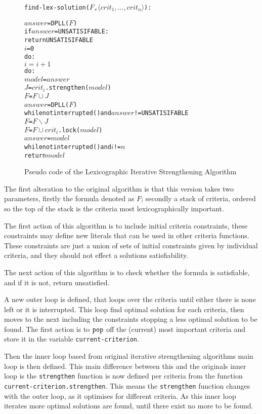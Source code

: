 \begin{figure}[htp]
\begin{center}
\begin{alltt}
find-lex-solution(\(F\), \(\langle crit_1, \ldots ,crit_n \rangle \)):
    
    \(answer\) = DPLL(\(F\))
    if \(answer\) = UNSATISIFABLE:
        return UNSATISIFABLE
    \(i\) = 0
    do:
        \(i = i + 1\)
        do:
            \(model\) = \(answer\)
            \(J\) = \(crit_i\).strengthen(\(model\))
            \(F\) = \(F \cup J\)
            \(answer\) = DPLL(\(F\))
        while not interrupted() and \(answer\) != UNSATISIFABLE
        \(F\) = \(F \backslash J\)
        \(F\) = \(F \cup \) \(crit_i\).lock(\(model\))
        \(answer\) = \(model\)
    while not interrupted() and \(i\) != \(n\)
    return \(model\) 
\end{alltt}
  \caption{Pseudo code of the Lexicographic Iterative Strengthening Algorithm}
  \label{impl.lexstrength}
\end{center}
\end{figure}

The first alteration to the original algorithm is that this version takes two parameters, firstly the formula denoted as $F$;
secondly a stack of criteria, ordered so the top of the stack is the criteria most lexicographically important.

The first action of this algorithm is to include initial criteria constraints,
these constraints may define new literals that can be used in other criteria functions.
These constraints are just a union of sets of initial constraints given by individual criteria, and they should not effect a solutions satisfiability. 

The next action of this algorithm is to check whether the formula is satisfiable,
and if it is not, return unsatisfied.

A new outer loop is defined, that loops over the criteria until either there is none left or it is interrupted.
This loop find optimal solution for each criteria, then moves to the next including the constraints stopping a less optimal solution to be found.
The first action is to $\verb+pop+$ off the (current) most important criteria and store it in the variable \verb+current-criterion+.

Then the inner loop based from original iterative strengthening algorithms main loop is then defined.
This main difference between this and the originals inner loop is the \texttt{strengthen} function is now defined per criteria from the function \verb+current-criterion.strengthen+.
This means the \texttt{strengthen} function changes with the outer loop, as it optimises for different criteria.
As this inner loop iterates more optimal solutions are found, until there exist no more to be found.

